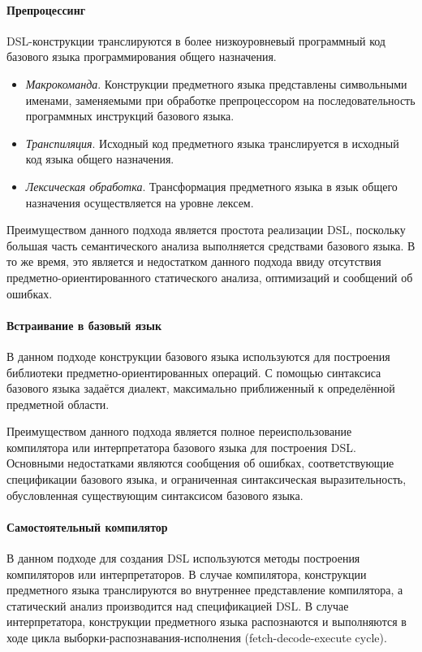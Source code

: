 \paragraph{Препроцессинг}
DSL-конструкции транслируются в более низкоуровневый программный код
базового языка программирования общего назначения.
\begin{itemize}
	\item \textit{Макрокоманда}. Конструкции предметного языка представлены
	символьными именами, заменяемыми при обработке препроцессором на
	последовательность программных инструкций базового языка.
	\item \textit{Транспиляция}. Исходный код предметного языка
	транслируется в исходный код языка общего назначения.
	\item \textit{Лексическая обработка}. Трансформация предметного языка в
	язык общего назначения осуществляется на уровне лексем.
\end{itemize}

Преимуществом данного подхода является простота реализации DSL, поскольку
большая часть семантического анализа выполняется средствами базового языка.
В то же время, это является и недостатком данного подхода ввиду отсутствия
предметно-ориентированного статического анализа, оптимизаций и сообщений об ошибках.

\paragraph{Встраивание в базовый язык}
В данном подходе конструкции базового языка используются для построения
библиотеки предметно-ориен\-тированных операций. С помощью синтаксиса
базового языка задаётся диалект, максимально приближенный к определённой
предметной области.

Преимуществом данного подхода является полное переиспользование компилятора или интерпретатора базового языка для построения DSL. Основными недостатками
являются сообщения об ошибках, соответствующие спецификации базового языка,
и ограниченная синтаксическая выразительность, обусловленная
существующим синтаксисом базового языка.

\paragraph{Самостоятельный компилятор}
В данном подходе для создания DSL используются методы построения
компиляторов или интерпретаторов. В случае компилятора, конструкции
предметного языка транслируются во внутреннее представление компилятора, а
статический анализ производится над спецификацией DSL. В случае
интерпретатора, конструкции предметного языка распознаются и выполняются
в ходе цикла выборки-распознавания-исполнения (fetch-decode-execute cycle).

